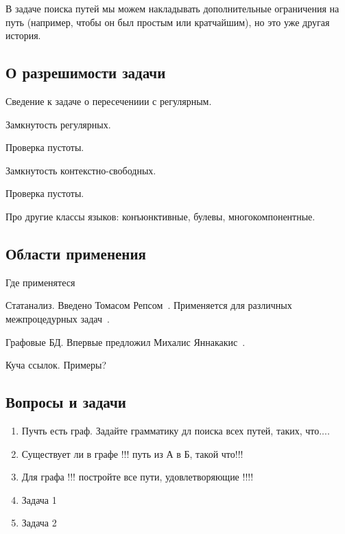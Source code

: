 В задаче поиска путей мы можем накладывать дополнительные ограничения на путь (например, чтобы он был простым или кратчайшим), но это уже другая история.


\subsection{О разрешимости задачи}

Сведение к задаче о пересечениии с регулярным.

Замкнутость регулярных.

Проверка пустоты.

Замкнутость контекстно-свободных.

Проверка пустоты.

Про другие классы языков: конъюнктивные, булевы, многокомпонентные.

\subsection{Области применения}

Где применятеся

Статанализ. 
Введено Томасом Репсом~\cite{Reps}.
Применяется для различных межпроцедурных задач~\cite{LabelFlowCFLReachability,specificationCFLReachability,Zheng}.

Графовые БД.
Впервые предложил Михалис Яннакакис~\cite{Yannakakis}.

Куча ссылок. Примеры?

\subsection{Вопросы и задачи}
\begin{enumerate}
  \item Пучть есть граф. Задайте грамматику дл поиска всех путей, таких, что....
  \item Существует ли в графе !!! путь из А в Б, такой что!!!
  \item Для графа !!! постройте все пути, удовлетворяющие !!!!

  \item Задача 1
  \item Задача 2
\end{enumerate}
